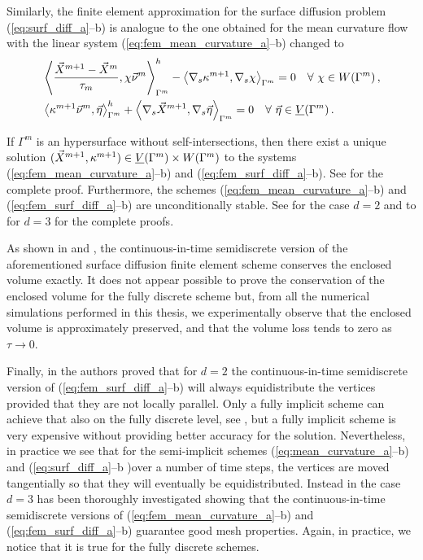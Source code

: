 Similarly, the finite element approximation for the surface diffusion problem
(\ref{eq:surf_diff_a}--b) is analogue to the one obtained for the mean
curvature flow with the linear system (\ref{eq:fem_mean_curvature_a}--b)
changed to
\begin{subequations}
\begin{align}
&\left\langle \frac{\vec X^{m + 1} - \vec X^m}{\tau_m},
\chi\vec \nu^m\right\rangle_{\Gamma^m}^h - \left\langle\nabla_s\kappa^{m+1},
\nabla_s\chi\right\rangle_{\Gamma^m}=0\quad \forall\ \chi \in
W(\Gamma^m)\,,\label{eq:fem_surf_diff_a}\\
&\left\langle\kappa^{m+1}\vec \nu^m, \vec \eta\right\rangle_{\Gamma^m}^h +
\left\langle\nabla_s\vec X^{m + 1},
\nabla_s\vec \eta\right\rangle_{\Gamma^m}=0\quad \forall\ \vec\eta \in \underline{V}(\Gamma^m)\,.
\label{eq:fem_surf_diff_b}
\end{align}
\end{subequations}

If $\Gamma^m$ is an hypersurface without self-intersections, then there exist
a unique solution $(\vec X^{m+1}, \kappa^{m+1}) \in \underline{V}(\Gamma^m) \times W(\Gamma^m)$ to the
systems (\ref{eq:fem_mean_curvature_a}--b) and (\ref{eq:fem_surf_diff_a}--b).
See \cite[Theorem~2.1]{gflows3d} for the complete proof. Furthermore,
the schemes (\ref{eq:fem_mean_curvature_a}--b) and
(\ref{eq:fem_surf_diff_a}--b) are unconditionally stable. See
\cite[Theorem~2.3]{triplej} for the case $d = 2$ and to
\cite[Theorem~2.2]{gflows3d} for $d = 3$ for the complete proofs.

As shown in \cite[Remark~2.3]{triplej} and \cite[\S~4]{gflows3d}, the
continuous-in-time semidiscrete version of the aforementioned surface
diffusion finite element scheme conserves the enclosed volume exactly. It does
not appear possible to prove the conservation of the enclosed volume for the
fully discrete scheme but, from all the numerical simulations performed in this
thesis, we experimentally observe that the enclosed volume is approximately
preserved, and that the volume loss tends to zero as $\tau \to 0$.

Finally, in \cite[Remark~2.4]{triplej} the authors proved that for $d=2$ the
continuous-in-time semidiscrete version of (\ref{eq:fem_surf_diff_a}--b)
will always equidistribute the vertices provided that they are not locally
parallel. Only a fully implicit scheme can achieve that also on the fully
discrete level, see \cite{fdfi}, but a fully implicit scheme is very
expensive without providing better accuracy for the solution. Nevertheless, in
practice we see that for the semi-implicit schemes
(\ref{eq:mean_curvature_a}--b) and (\ref{eq:surf_diff_a}--b )over a number of
time steps, the vertices are moved tangentially so that they will eventually be
equidistributed. Instead in \cite[\S~4]{gflows3d} the case $d=3$ has been
thoroughly investigated showing that the continuous-in-time semidiscrete
versions of (\ref{eq:fem_mean_curvature_a}--b) and
(\ref{eq:fem_surf_diff_a}--b) guarantee good mesh properties. Again, in
practice, we notice that it is true for the fully discrete schemes.


